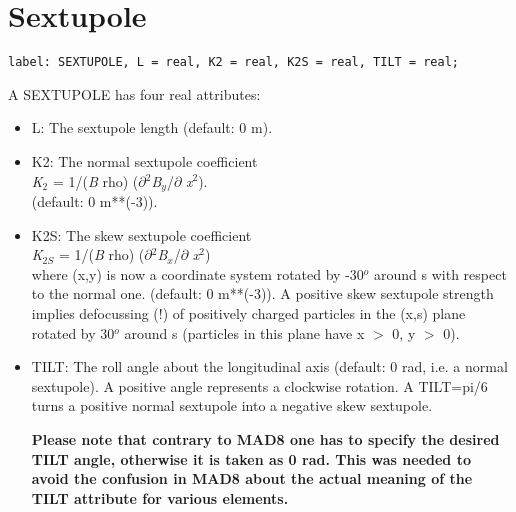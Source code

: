 
\section{Sextupole}

\begin{verbatim}
label: SEXTUPOLE, L = real, K2 = real, K2S = real, TILT = real;
\end{verbatim} 

A SEXTUPOLE has four real attributes: 
\begin{itemize}
    \item L: The sextupole length (default: 0 m). 
    \item K2: The normal sextupole coefficient \\
      \textit{K}$_2$ = 1/(\textit{B} rho)
      ($\partial$$^2$\textit{B$_y$}/$\partial$ \textit{x}$^2$). \\       
      (default: 0 m**(-3)). 
    \item K2S: The skew sextupole coefficient \\
      \textit{K}$_{2S}$ = 1/(\textit{B} rho)
      ($\partial$$^2$\textit{B$_x$}/$\partial$ \textit{x}$^2$)
      \\
      where (x,y) is now a coordinate system rotated by -30$^o$ around s with
      respect to the normal one. (default: 0 m**(-3)). A positive skew
      sextupole strength implies defocussing (!) of positively charged
      particles in the (x,s) plane rotated by 30$^o$ around s (particles in
      this plane have x $>$ 0, y $>$ 0).  


    \item TILT: The roll angle about the longitudinal axis (default: 0
      rad, i.e. a normal sextupole). A positive angle represents a
      clockwise rotation. A TILT=pi/6 turns a positive normal sextupole
      into a negative skew sextupole.
      
      \textbf{  Please note that contrary to MAD8 one has to specify the
        desired TILT angle, otherwise it is taken as 0 rad. This was needed to
        avoid the confusion in MAD8 about the actual meaning of the TILT
        attribute for various elements. } 
\end{itemize}

